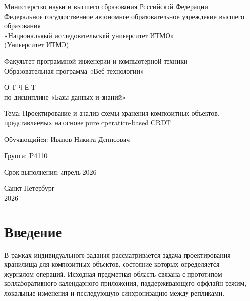 \documentclass[a4paper,14pt]{extarticle}
\def\uppercase#1{#1}%
\def\normalsize{}%
\def\textbf#1{#1}%
\newcommand{\withoutnumber}[1]{%
    \clearpage
    \section*{\centering\normalsize\uppercase{#1}}
    \addcontentsline{toc}{section}{\normalsize \uppercase{#1}}
}
\begin{document}
\begin{titlepage}
\thispagestyle{empty}
\begin{center}
    \textbf{Министерство науки и высшего образования Российской Федерации}\\
    \textbf{Федеральное государственное автономное образовательное учреждение высшего образования}\\
    \textbf{«Национальный исследовательский университет ИТМО»}\\
    (Университет ИТМО)

    \vspace{1cm}

    \textbf{Факультет программной инженерии и компьютерной техники}\\
    \textbf{Образовательная программа «Веб-технологии»}

    \vspace{2cm}

    \textbf{\large О Т Ч Ё Т}\\
    \textbf{по дисциплине «Базы данных и знаний»}

    \vspace{1.5cm}

    \begin{flushleft}
    \textbf{Тема:} Проектирование и анализ схемы хранения композитных объектов, представляемых на основе pure operation-based CRDT

    \vspace{0.5cm}

    \textbf{Обучающийся:} Иванов Никита Денисович

    \vspace{0.5cm}

    \textbf{Группа:} P4110

    \vspace{0.5cm}

    \textbf{Срок выполнения:} апрель 2026
    \end{flushleft}

    \vfill

    Санкт-Петербург\\
    2026
\end{center}
\end{titlepage}

\setcounter{page}{2}

\tableofcontents
\clearpage

\withoutnumber{Введение}

В рамках индивидуального задания рассматривается задача проектирования хранилища
для композитных объектов, состояние которых определяется журналом операций.
Исходная предметная область связана с прототипом коллаборативного календарного
приложения, поддерживающего оффлайн-режим, локальные изменения и последующую
синхронизацию между репликами.
\end{document}
